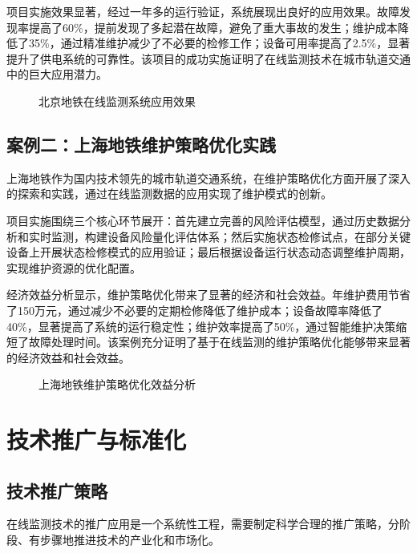 项目实施效果显著，经过一年多的运行验证，系统展现出良好的应用效果。故障发现率提高了60\%，提前发现了多起潜在故障，避免了重大事故的发生；维护成本降低了35\%，通过精准维护减少了不必要的检修工作；设备可用率提高了2.5\%，显著提升了供电系统的可靠性。该项目的成功实施证明了在线监测技术在城市轨道交通中的巨大应用潜力。

\begin{figure}[h]
\centering
\caption{北京地铁在线监测系统应用效果}
\label{fig:beijing_metro_case}
\end{figure}

\subsection{案例二：上海地铁维护策略优化实践}

上海地铁作为国内技术领先的城市轨道交通系统，在维护策略优化方面开展了深入的探索和实践，通过在线监测数据的应用实现了维护模式的创新。

项目实施围绕三个核心环节展开：首先建立完善的风险评估模型，通过历史数据分析和实时监测，构建设备风险量化评估体系；然后实施状态检修试点，在部分关键设备上开展状态检修模式的应用验证；最后根据设备运行状态动态调整维护周期，实现维护资源的优化配置。

经济效益分析显示，维护策略优化带来了显著的经济和社会效益。年维护费用节省了150万元，通过减少不必要的定期检修降低了维护成本；设备故障率降低了40\%，显著提高了系统的运行稳定性；维护效率提高了50\%，通过智能维护决策缩短了故障处理时间。该案例充分证明了基于在线监测的维护策略优化能够带来显著的经济效益和社会效益。

\begin{figure}[h]
\centering
\caption{上海地铁维护策略优化效益分析}
\label{fig:shanghai_metro_case}
\end{figure}

\section{技术推广与标准化}

\subsection{技术推广策略}

在线监测技术的推广应用是一个系统性工程，需要制定科学合理的推广策略，分阶段、有步骤地推进技术的产业化和市场化。

